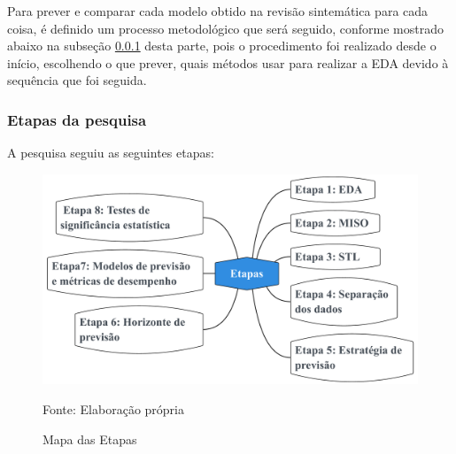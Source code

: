 Para prever e comparar cada modelo obtido na revisão sintemática para cada coisa, é definido um processo metodológico que será seguido, conforme mostrado abaixo na subseção \ref{subsubsec:etp} desta parte, pois o procedimento foi realizado desde o início, escolhendo o que prever, quais métodos usar para realizar a EDA devido à sequência que foi seguida.
   
    \subsubsection{Etapas da pesquisa}\label{subsubsec:etp}
    A pesquisa seguiu as seguintes etapas:
    \begin{figure}[H]
    	\centering
    	\caption{Mapa das Etapas}
    	\label{fig:etapas}
    	\includegraphics[width=0.9\linewidth]{Introducao/Figuras/Etapas}
    	
    	Fonte: Elaboração própria
    \end{figure}
